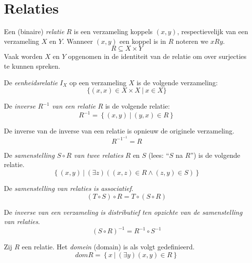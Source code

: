 \documentclass[main.tex]{subfiles}
\begin{document}
\chapter{Relaties}
\label{cha:relaties}

\begin{de}
  Een (binaire) \emph{relatie} $R$ is een verzameling koppels $(x,y)$, respectievelijk van een verzameling $X$ en $Y$. 
  Wanneer $(x,y)$ een koppel is in $R$ noteren we $x R y$.
  \[ R \subseteq X \times Y \]
  Vaak worden $X$ en $Y$ opgenomen in de identiteit van de relatie om over surjecties te kunnen spreken.
\end{de}

\begin{de}
  De \emph{eenheidsrelatie} $I_{X}$ op een verzameling $X$ is de volgende verzameling:
  \[ \{(x,x) \in X \times X\ |\ x \in X \} \]
\end{de}

\begin{de}
  De \emph{inverse $R^{-1}$ van een relatie} $R$ is de volgende relatie:
  \[ R^{-1} = \left\{ (x,y)\ |\ (y,x) \in R \right\} \]
\end{de}

\begin{st}
  De inverse van de inverse van een relatie is opnieuw de originele verzameling.
  \[ R^{-1^{-1}} = R \]
\end{st}

\begin{de}
  De \emph{samenstelling $S \circ R$ van twee relaties} $R$ en $S$ (lees: ``$S$ na $R$'') is de volgende relatie.
  \[ \left\{ (x,y) \ |\ (\exists z) ((x,z) \in R \wedge (z,y) \in S) \right\} \]
\end{de}

\begin{st}
  \label{st:samenstelling-relaties-associatief}
  De \emph{samenstelling van relaties is associatief}.
  \[ (T \circ S) \circ R = T \circ (S \circ R) \]
\end{st}

\begin{st}
  De \emph{inverse van een verzameling is distributief ten opzichte van de samenstelling van relaties}.
  \[ (S \circ R)^{-1} = R^{-1} \circ S^{-1} \]
\end{st}

\begin{de}
  Zij $R$ een relatie. Het \emph{domein} (domain) is als volgt gedefinieerd.
  \[ dom R = \left\{ x \ |\ (\exists y)(x,y) \in R \right\} \]
\end{de}
\end{document}
